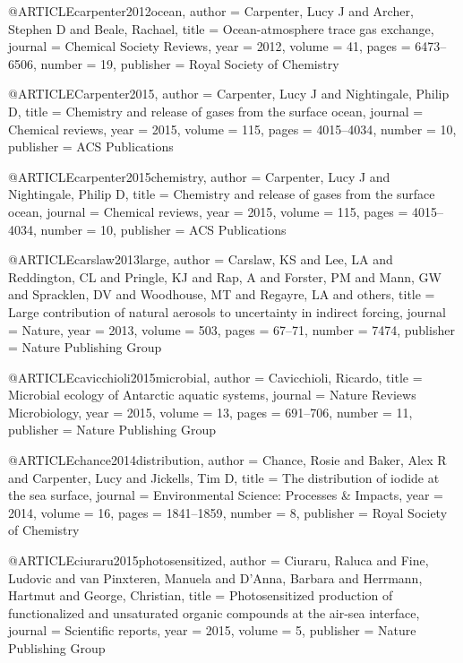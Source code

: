 @ARTICLE{carpenter2012ocean,
  author = {Carpenter, Lucy J and Archer, Stephen D and Beale, Rachael},
  title = {Ocean-atmosphere trace gas exchange},
  journal = {Chemical Society Reviews},
  year = {2012},
  volume = {41},
  pages = {6473--6506},
  number = {19},
  publisher = {Royal Society of Chemistry}
}

@ARTICLE{Carpenter2015,
  author = {Carpenter, Lucy J and Nightingale, Philip D},
  title = {Chemistry and release of gases from the surface ocean},
  journal = {Chemical reviews},
  year = {2015},
  volume = {115},
  pages = {4015--4034},
  number = {10},
  publisher = {ACS Publications}
}

@ARTICLE{carpenter2015chemistry,
  author = {Carpenter, Lucy J and Nightingale, Philip D},
  title = {Chemistry and release of gases from the surface ocean},
  journal = {Chemical reviews},
  year = {2015},
  volume = {115},
  pages = {4015--4034},
  number = {10},
  publisher = {ACS Publications}
}

@ARTICLE{carslaw2013large,
  author = {Carslaw, KS and Lee, LA and Reddington, CL and Pringle, KJ and Rap,
	A and Forster, PM and Mann, GW and Spracklen, DV and Woodhouse, MT
	and Regayre, LA and others},
  title = {Large contribution of natural aerosols to uncertainty in indirect
	forcing},
  journal = {Nature},
  year = {2013},
  volume = {503},
  pages = {67--71},
  number = {7474},
  publisher = {Nature Publishing Group}
}

@ARTICLE{cavicchioli2015microbial,
  author = {Cavicchioli, Ricardo},
  title = {Microbial ecology of Antarctic aquatic systems},
  journal = {Nature Reviews Microbiology},
  year = {2015},
  volume = {13},
  pages = {691--706},
  number = {11},
  publisher = {Nature Publishing Group}
}

@ARTICLE{chance2014distribution,
  author = {Chance, Rosie and Baker, Alex R and Carpenter, Lucy and Jickells,
	Tim D},
  title = {The distribution of iodide at the sea surface},
  journal = {Environmental Science: Processes \& Impacts},
  year = {2014},
  volume = {16},
  pages = {1841--1859},
  number = {8},
  publisher = {Royal Society of Chemistry}
}

@ARTICLE{ciuraru2015photosensitized,
  author = {Ciuraru, Raluca and Fine, Ludovic and van Pinxteren, Manuela and
	D’Anna, Barbara and Herrmann, Hartmut and George, Christian},
  title = {Photosensitized production of functionalized and unsaturated organic
	compounds at the air-sea interface},
  journal = {Scientific reports},
  year = {2015},
  volume = {5},
  publisher = {Nature Publishing Group}
}

